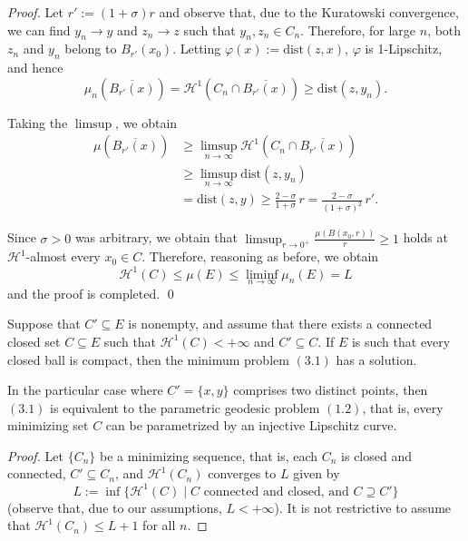 \documentclass[12pt]{article}
\begin{document}
{\begin{proof}
Let $r' := (1+\sigma)r$ and observe that, due to the Kuratowski convergence,
we can find $y_n \to y$ and $z_n \to z$ such that $y_n, z_n \in C_n$. Therefore, for
large $n$, both $z_n$ and $y_n$ belong to $B_{r'}(x_0)$. Letting $\varphi(x) := \mathrm{dist}(z, x)$,
$\varphi$ is 1-Lipschitz, and hence
\[
    \mu_n\!\left(\overline{B_{r'}(x)}\right) = \mathcal{H}^1\!\left(C_n \cap \overline{B_{r'}(x)}\right) \geqslant \mathrm{dist}(z, y_n).
\]

Taking the $\limsup$, we obtain
\begin{align*}
    \mu\!\left(\overline{B_{r'}(x)}\right)
        &\geqslant \limsup_{n \to \infty} \mathcal{H}^1\!\left(C_n \cap \overline{B_{r'}(x)}\right) \\
        &\geqslant \limsup_{n \to \infty} \mathrm{dist}(z, y_n) \\
        &= \mathrm{dist}(z, y) \geqslant \frac{2 - \sigma}{1 + \sigma}\,r = \frac{2 - \sigma}{(1 + \sigma)^2}\,r'.
\end{align*}

Since $\sigma > 0$ was arbitrary, we obtain that $ \limsup_{r \to 0^+} \frac{\mu(B(x_0,r))}{r} \geqslant 1$ holds at $\mathcal{H}^1$-almost every $x_0 \in C$. Therefore, reasoning as before, we obtain
\[
    \mathcal{H}^1(C) \leqslant \mu(E) \leqslant \liminf_{n \to \infty} \mu_n(E) = L
\]
and the proof is completed. \qed \hfill\myqedsymbol

\end{proof}


\begin{theorem}
     Suppose that $C' \subseteq E$ is nonempty, and assume that there exists a connected closed
    set $C \subseteq E$ such that $\mathcal{H}^1(C) < +\infty$ and $C' \subseteq C$. If $E$ is such that every closed ball is compact, then the minimum problem $(3.1)$ has a solution.

    In the particular case where $C' = \{x, y\}$ comprises two distinct
points, then $(3.1)$  is equivalent to the parametric
geodesic problem $(1.2)$, that is, every minimizing set $C$ can be
parametrized by an injective Lipschitz curve.
\end{theorem}

\begin{proof}
    Let $\{C_n\}$ be a minimizing sequence, that is, each $C_n$ is closed
and connected, $C' \subseteq C_n$, and $\mathcal{H}^1(C_n)$ converges to $L$ given by
\[
    L := \inf\{\mathcal{H}^1(C) \mid C \text{ connected and closed, and } C \supseteq C'\}
\]
(observe that, due to our assumptions, $L < +\infty$). It is not restrictive
to assume that $\mathcal{H}^1(C_n) \leqslant L + 1$ for all $n$.


\end{proof}}
\end{document}
